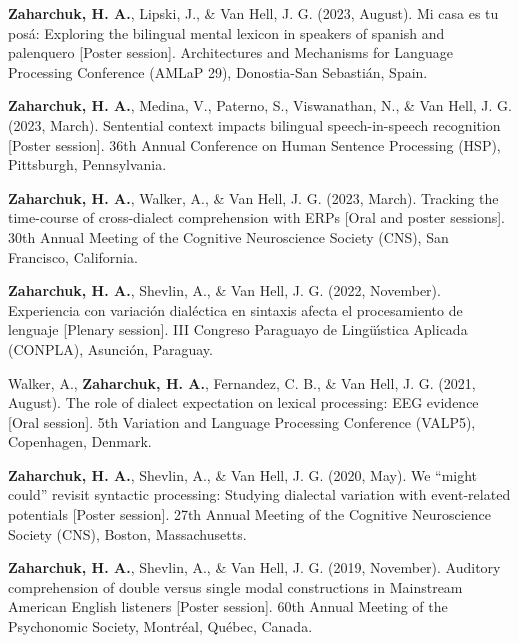\documentclass[11pt,a4paper,]{awesome-cv}
\begin{document}
\leavevmode{}%
\textbf{\textbf{Zaharchuk, H.} A.}, Lipski, J., \& Van Hell, J. G. (2023, August). Mi casa
es tu posá: Exploring the bilingual mental lexicon in speakers of
spanish and palenquero {[}Poster session{]}. Architectures and
Mechanisms for Language Processing Conference (AMLaP 29), Donostia-San
Sebastián, Spain.

\leavevmode{}%
\textbf{\textbf{Zaharchuk, H.} A.}, Medina, V., Paterno, S., Viswanathan, N., \& Van Hell,
J. G. (2023, March). Sentential context impacts bilingual
speech-in-speech recognition {[}Poster session{]}. 36th Annual
Conference on Human Sentence Processing (HSP), Pittsburgh, Pennsylvania.

\leavevmode{}%
\textbf{\textbf{Zaharchuk, H.} A.}, Walker, A., \& Van Hell, J. G. (2023, March). Tracking
the time-course of cross-dialect comprehension with ERPs {[}Oral and
poster sessions{]}. 30th Annual Meeting of the Cognitive Neuroscience
Society (CNS), San Francisco, California.

\leavevmode{}%
\textbf{\textbf{Zaharchuk, H.} A.}, Shevlin, A., \& Van Hell, J. G. (2022, November).
Experiencia con variación dialéctica en sintaxis afecta el procesamiento
de lenguaje {[}Plenary session{]}. III Congreso Paraguayo de Lingüı́stica
Aplicada (CONPLA), Asunción, Paraguay.

\leavevmode{}%
Walker, A., \textbf{\textbf{Zaharchuk, H.} A.}, Fernandez, C. B., \& Van Hell, J. G.
(2021, August). The role of dialect expectation on lexical processing:
EEG evidence {[}Oral session{]}. 5th Variation and Language Processing
Conference (VALP5), Copenhagen, Denmark.

\leavevmode{}%
\textbf{\textbf{Zaharchuk, H.} A.}, Shevlin, A., \& Van Hell, J. G. (2020, May). We
{``might could''} revisit syntactic processing: Studying dialectal
variation with event-related potentials {[}Poster session{]}. 27th
Annual Meeting of the Cognitive Neuroscience Society (CNS), Boston,
Massachusetts.

\leavevmode{}%
\textbf{\textbf{Zaharchuk, H.} A.}, Shevlin, A., \& Van Hell, J. G. (2019, November).
Auditory comprehension of double versus single modal constructions in
Mainstream American English listeners {[}Poster session{]}. 60th Annual
Meeting of the Psychonomic Society, Montréal, Québec, Canada.
\end{document}
